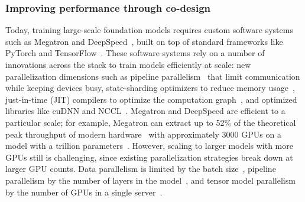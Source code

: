 \subsubsection{Improving performance through co-design} \label{sec:systems-co-design}

Today, training large-scale foundation models requires custom software systems such as Megatron and DeepSpeed~\citep{shoeybi2019megatronlm, rasley2020deepspeed}, built on top of standard frameworks like PyTorch and TensorFlow~\citep{paszke2019pytorch, abadi2016tensorflow}. These software systems rely on a number of innovations across the stack to train models efficiently at scale: new parallelization dimensions such as pipeline parallelism~\citep{huang2019gpipe, narayanan2019pipedream} that limit communication while keeping devices busy, state-sharding optimizers to reduce memory usage~\citep{rajbhandari2020zero}, just-in-time (JIT) compilers to optimize the computation graph~\citep{pytorchjit}, and optimized libraries like cuDNN and NCCL~\citep{nccl}. Megatron and DeepSpeed are efficient to a particular scale; for example, Megatron can extract up to 52\% of the theoretical peak throughput of modern hardware~ with approximately 3000 GPUs on a model with a trillion parameters~\citep{narayanan2021efficient}. However, scaling to larger models with more GPUs still is challenging, since existing parallelization strategies break down at larger GPU counts. Data parallelism is limited by the batch size~\citep{li2020pytorch}, pipeline parallelism by the number of layers in the model~\citep{huang2019gpipe, narayanan2019pipedream}, and tensor model parallelism by the number of GPUs in a single server~\citep{shoeybi2019megatronlm}.

